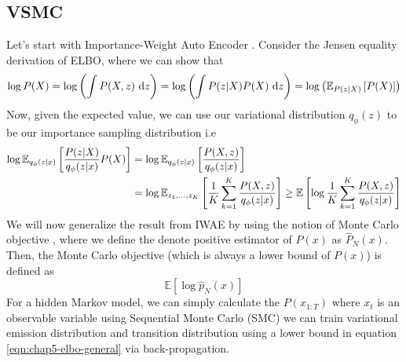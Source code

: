 \label{sec:chap5-VSMC-DVL}

\subsection{VSMC}
Let's start with Importance-Weight Auto Encoder \cite{burda2015importance}. Consider the Jensen equality derivation of ELBO, where we can show that 
\begin{equation}
    \log P(X) = \log \left( \int P(X, z) \ \mathrm{d} z \right)  = \log \left( \int P(z|X) P(X) \ \mathrm{d} z \right) = \log \left( \mathbb{E}_{P(z | X)}\left[ P(X) \right] \right)
\end{equation}
Now, given the expected value, we can use our variational distribution $q_\phi(z)$ to be our importance sampling distribution i.e
\begin{equation}
\begin{aligned}
    \log \mathbb{E}_{q_\phi(z |x)}\left[ \frac{P(z | X)}{q_\phi(z |x)} P(X) \right] &= \log \mathbb{E}_{q_\phi(z |x)}\left[ \frac{P(X, z)}{q_\phi(z |x)} \right] \\
    &= \log \mathbb{E}_{z_1, \dots, z_K}\left[ \frac{1}{K}\sum^K_{k=1} \frac{P(X, z)}{q_\phi(z |x)} \right] \ge \mathbb{E}\left[ \log \frac{1}{K}\sum^K_{k=1} \frac{P(X, z)}{q_\phi(z |x)} \right]
\end{aligned}
\end{equation}
We will now generalize the result from IWAE by using the notion of Monte Carlo objective \cite{maddison2017filtering}, where we define the denote positive estimator of $P(x)$ as $\hat{P}_N(x)$. Then, the Monte Carlo objective (which is always a lower bound of $P(x)$) is defined as 
\begin{equation}
\label{eqn:chap5-elbo-general}
    \mathbb{E}[\log \hat{p}_N(x)]
\end{equation}
For a hidden Markov model, we can simply calculate the $P(x_{1:T})$ where $x_t$ is an observable variable using Sequential Monte Carlo (SMC) \cite{doucet2001introduction} we can train variational emission distribution and transition distribution using a lower bound in equation \ref{eqn:chap5-elbo-general} via back-propagation.  

